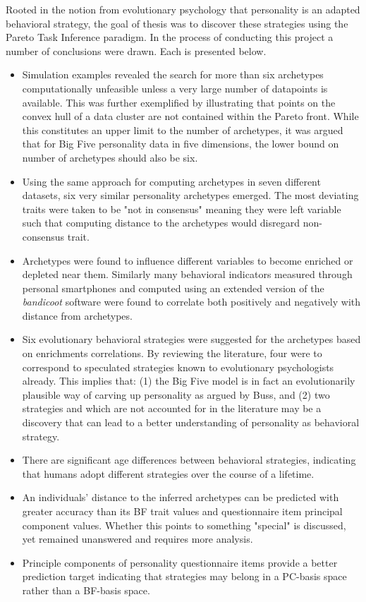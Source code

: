 Rooted in the notion from evolutionary psychology that personality is an adapted behavioral strategy, the goal of thesis was to discover these strategies using the Pareto Task Inference paradigm. In the process of conducting this project a number of conclusions were drawn. Each is presented below.

\begin{itemize}
	\item Simulation examples revealed the search for more than six archetypes computationally unfeasible unless a very large number of datapoints is available. This was further exemplified by illustrating that points on the convex hull of a data cluster are not contained within the Pareto front. While this constitutes an upper limit to the number of archetypes, it was argued that for Big Five personality data in five dimensions, the lower bound on number of archetypes should also be six.
	\item Using the same approach for computing archetypes in seven different datasets, six very similar personality archetypes emerged. The most deviating traits were taken to be "not in consensus" meaning they were left variable such that computing distance to the archetypes would disregard non-consensus trait.
	\item Archetypes were found to influence different variables to become enriched or depleted near them. Similarly many behavioral indicators measured through personal smartphones and computed using an extended version of the \textit{bandicoot} software were found to correlate both positively and negatively with distance from archetypes.
	\item Six evolutionary behavioral strategies were suggested for the archetypes based on enrichments correlations. By reviewing the literature, four were to correspond to speculated strategies known to evolutionary psychologists already. This implies that: (1) the Big Five model is in fact an evolutionarily plausible way of carving up personality as argued by Buss, and (2) two strategies \achiever and \host which are not accounted for in the literature may be a discovery that can lead to a better understanding of personality as behavioral strategy.
	\item There are significant age differences between behavioral strategies, indicating that humans adopt different strategies over the course of a lifetime.
	\item An individuals' distance to the inferred archetypes can be predicted with greater accuracy than its BF trait values and questionnaire item principal component values. Whether this points to something "special" is discussed, yet remained unanswered and requires more analysis.
	\item Principle components of personality questionnaire items provide a better prediction target indicating that strategies may belong in a PC-basis space rather than a BF-basis space.
\end{itemize}

